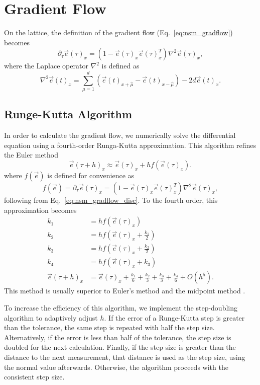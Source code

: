 \documentclass[12pt]{report}
\newcommand{\e}{\vec e}
\begin{document}
\section{Gradient Flow}
\label{sec:gradflow_disc}
On the lattice, the definition of the gradient flow (Eq.~\ref{eq:nsm_gradflow}) becomes 
\begin{equation}
    \label{eq:nsm_gradflow_disc}
    \partial_\tau \e (\tau)_x = \left( 1 - \e(\tau)_x \e(\tau)_x^T\right) \nabla^2 \e(\tau)_x,
\end{equation}
 where the Laplace operator $\nabla^2$ is defined as
\begin{equation*}
    \nabla^2 \e(t)_x = \sum^d_{\mu=1} \left( \e(t)_{x+\hat \mu} - \e(t)_{x-\hat \mu}\right) - 2 d \e(t)_x.
\end{equation*}

\subsection{Runge-Kutta Algorithm}
In order to calculate the gradient flow, we numerically solve the differential equation using a fourth-order Runga-Kutta approximation. This algorithm refines the Euler method 
\begin{equation*}
    \e(\tau+h)_x \approx \e(\tau)_x + h f(\e(\tau)_x).
\end{equation*}
where $f(\e)$ is defined for convenience as 
\begin{equation}
    f(\e)=\partial_\tau \e (\tau)_x  = \left( 1 - \e(\tau)_x \e(\tau)_x^T\right) \nabla^2 \e(\tau)_x,
\end{equation}
following from Eq.~\ref{eq:nsm_gradflow_disc}. To the fourth order, this approximation becomes 
%
\begin{align}
    \label{eq:rungekutta}
    k_1 &= h f\left(\e\left(\tau\right)_x\right) \\ 
    k_2 &= h f\left(\e\left(\tau\right)_x + \frac{k_1}{2}\right) \\ 
    k_3 &= h f\left(\e\left(\tau\right)_x + \frac{k_2}{2}\right) \\ 
    k_4 &= h f\left(\e\left(\tau\right)_x + k_3\right) \\ 
    \e(\tau+h)_x &= \e(\tau)_x + \frac{k_1}{6} + \frac{k_2}{3} + \frac{k_3}{3} + \frac{k_4}{6} + O(h^5).
\end{align}
This method is usually superior to Euler's method and the midpoint method \cite{vetterling1992}.

To increase the efficiency of this algorithm, we implement the step-doubling algorithm to adaptively adjust $h$. If the error of a Runge-Kutta step is greater than the tolerance, the same step is repeated with half the step size. Alternatively, if the error is less than half of the tolerance, the step size is doubled for the next calculation. Finally, if the step size is greater than the distance to the next measurement, that distance is used as the step size, using the normal value afterwards. Otherwise, the algorithm proceeds with the consistent step size. 
\end{document}
